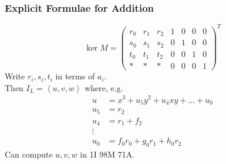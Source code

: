 \documentclass{beamer}
\newcommand{\pid}[1]{\left\langle #1 \right\rangle}
\newcommand{\backupend}{
   \addtocounter{framenumbervorappendix}{-\value{framenumber}}
   \addtocounter{framenumber}{\value{framenumbervorappendix}}
}
\begin{document}

\begin{frame}
\frametitle{Explicit Formulae for Addition}
  \[ \ker M = \begin{pmatrix}
    r_0 & r_1 & r_2 & 1 & 0 & 0 & 0 \\
    s_0 & s_1 & s_2 & 0 & 1 & 0 & 0 \\
    t_0 & t_1 & t_2 & 0 & 0 & 1 & 0 \\
      * &   * &   * & 0 & 0 & 0 & 1
  \end{pmatrix}^T \]
  Write $r_i, s_i, t_i$ in terms of $a_i$. \\
  Then $I_L = \pid{u, v, w}$ where, e.g.
  \begin{align*}
    u &= x^3 + u_5y^2 + u_4xy + \dots + u_0 \\
    u_5 &= r_2 \\
    u_4 &= r_1 + f_2 \\
    \vdots \\
    u_0 &= f_0r_0 + g_0r_1 + h_0r_2
  \end{align*}
  Can compute $u, v, w$ in 1I 98M 71A.
\end{frame}


\backupend
\end{document}
